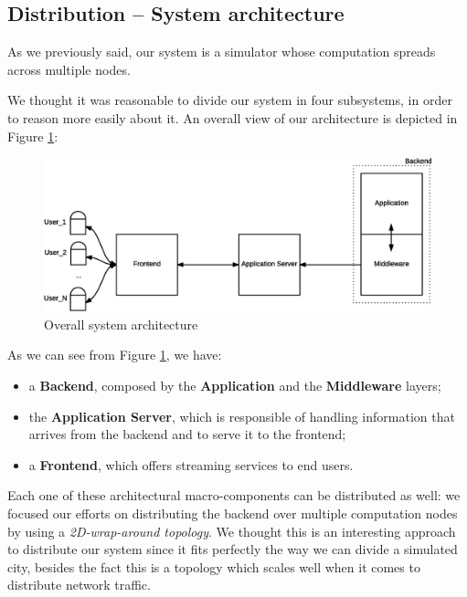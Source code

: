 \subsection{Distribution -- System architecture}
As we previously said, our system is a simulator whose computation spreads
across multiple nodes.

We thought it was reasonable to divide our system in four subsystems, in order
to reason more easily about it. An overall view of our architecture is depicted
in Figure \ref{fig:sd-sys-arch-overall}:

\begin{figure}[H]
  \centering
  \includegraphics[scale=0.5,keepaspectratio]
    {images/solution/overall-arch.eps}
  \caption{Overall system architecture}
  \label{fig:sd-sys-arch-overall}
\end{figure}

As we can see from Figure \ref{fig:sd-sys-arch-overall}, we have:

\begin{itemize}
  \item a \textbf{Backend}, composed by the \textbf{Application} and the
    \textbf{Middleware} layers;
  \item the \textbf{Application Server}, which is responsible of handling
    information that arrives from the backend and to serve it to the frontend;
  \item a \textbf{Frontend}, which offers streaming services to end users.
\end{itemize}

Each one of these architectural macro-components can be distributed as well: we
focused our efforts on distributing the backend over multiple computation nodes
by using a \textit{2D-wrap-around topology}.
We thought this is an interesting approach to distribute our system since it
fits perfectly the way we can divide a simulated city, besides the fact this is
a topology which scales well when it comes to distribute network traffic.


